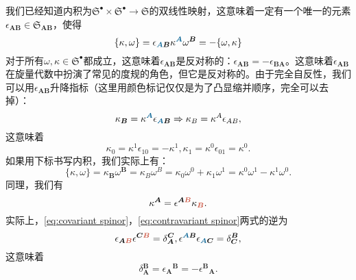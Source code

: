 我们已经知道内积为$\mathfrak{S}^{\bullet } \times \mathfrak{S}^{\bullet }\rightarrow \mathfrak{S}$的双线性映射，这意味着一定有一个唯一的元素$\epsilon _{\boldsymbol{AB}} \in \mathfrak{S}_{\boldsymbol{AB}}$，使得
\begin{equation*}
	\{\kappa ,\omega \} =\epsilon _{\boldsymbol{\textcolor{roulan}{A} B}} \kappa ^{\boldsymbol{\textcolor{roulan}{A}}} \omega ^{\boldsymbol{B}} =-\{\omega ,\kappa \}
\end{equation*}
对于所有$\omega ,\kappa \in \mathfrak{S}^{\bullet }$都成立，这意味着$\epsilon _{\boldsymbol{AB}}$是反对称的：$\epsilon _{\boldsymbol{AB}} =-\epsilon _{\boldsymbol{BA}}$。这意味着$\epsilon _{\boldsymbol{AB}}$在旋量代数中扮演了常见的度规的角色，但它是反对称的。由于完全自反性，我们可以用$\epsilon _{\boldsymbol{AB}}$升降指标（这里用颜色标记仅仅是为了凸显缩并顺序，完全可以去掉）：
\begin{equation}
	\kappa _{\boldsymbol{B}} =\kappa ^{\boldsymbol{\textcolor{roulan}{A}}} \epsilon _{\boldsymbol{\textcolor{roulan}{A} B}} \Rightarrow \kappa _{B} =\kappa ^{A} \epsilon _{AB} ,
	\label{eq:covariant spinor}
\end{equation}
这意味着
\begin{equation*}
	\kappa _{0} =\kappa ^{1} \epsilon _{10} =-\kappa ^{1} ,\kappa _{1} =\kappa ^{0} \epsilon _{01} =\kappa ^{0} .
\end{equation*}
如果用下标书写内积，我们实际上有：
\begin{equation*}
	\{\kappa ,\omega \} =\kappa _{\boldsymbol{B}} \omega ^{\boldsymbol{B}} =\kappa _{B} \omega ^{B} =\kappa _{0} \omega ^{0} +\kappa _{1} \omega ^{1} =\kappa ^{0} \omega ^{1} -\kappa ^{1} \omega ^{0} .
\end{equation*}
同理，我们有
\begin{equation}
	\kappa ^{\boldsymbol{A}} =\epsilon ^{\boldsymbol{A\textcolor{mulan}{B}}} \kappa _{\boldsymbol{\textcolor{mulan}{B}}} .
	\label{eq:contravariant spinor}
\end{equation}
实际上，\ref{eq:covariant spinor}，\ref{eq:contravariant spinor}两式的逆为
\begin{equation*}
	\epsilon _{\boldsymbol{A\textcolor{mulan}{B}}} \epsilon ^{\boldsymbol{C\textcolor{mulan}{B}}} =\delta _{\boldsymbol{A}}^{\boldsymbol{C}} ,\epsilon ^{\boldsymbol{\textcolor{roulan}{A} B}} \epsilon _{\boldsymbol{\textcolor{roulan}{A} C}} =\delta _{\boldsymbol{C}}^{\boldsymbol{B}} ,
\end{equation*}
这意味着
\begin{equation}
	\delta \boldsymbol{_{A}^{B}} =\epsilon {_{\boldsymbol{A}}}^{\boldsymbol{B}} =-\epsilon ^{\boldsymbol{B}}{}_{\boldsymbol{A}} .
	\label{eq:k delta}
\end{equation}
